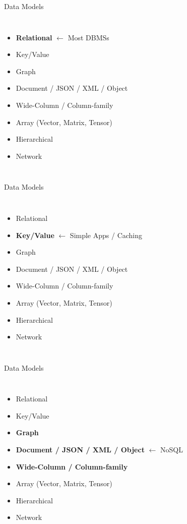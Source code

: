 \begin{frame}{Data Models}
    \begin{columns}
        \begin{itemize}
            \item \textbf{Relational} $\leftarrow$ Most DBMSs
            \item Key/Value
            \item Graph
            \item Document / JSON / XML / Object
            \item Wide-Column / Column-family
            \item Array (Vector, Matrix, Tensor)
            \item Hierarchical
            \item Network
        \end{itemize}
    \end{columns}
\end{frame}

\begin{frame}{Data Models}
    \begin{columns}
        \begin{itemize}
            \item Relational
            \item \textbf{Key/Value} $\leftarrow$ Simple Apps / Caching
            \item Graph
            \item Document / JSON / XML / Object
            \item Wide-Column / Column-family
            \item Array (Vector, Matrix, Tensor)
            \item Hierarchical
            \item Network
        \end{itemize}
    \end{columns}
\end{frame}

\begin{frame}{Data Models}
    \begin{columns}
        \begin{itemize}
            \item Relational
            \item Key/Value
            \item \textbf{Graph}
            \item \textbf{Document / JSON / XML / Object} $\leftarrow$ NoSQL
            \item \textbf{Wide-Column / Column-family}
            \item Array (Vector, Matrix, Tensor)
            \item Hierarchical
            \item Network
        \end{itemize}
    \end{columns}
\end{frame}

